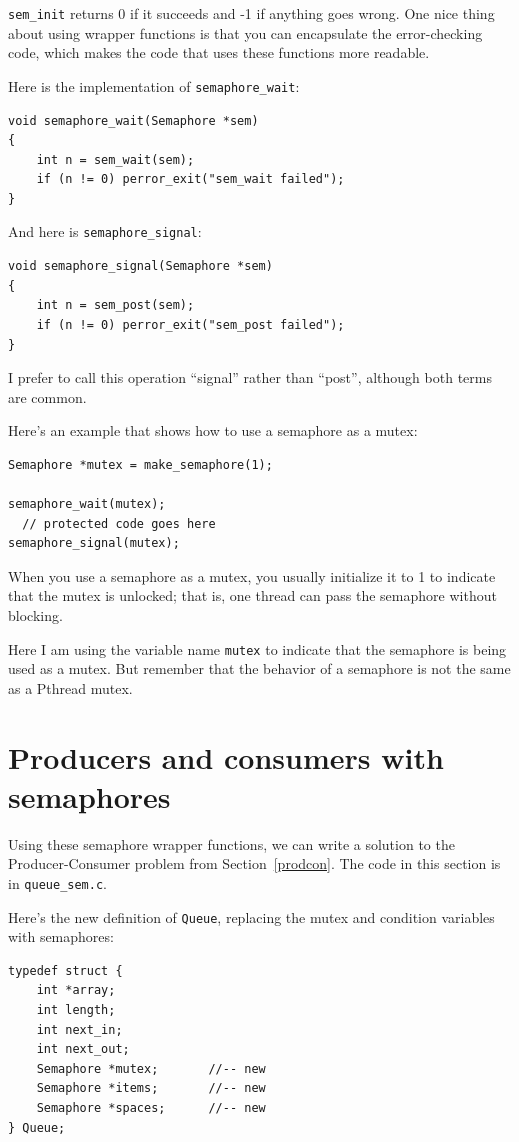 \documentclass[12pt]{book}
\begin{document}
{{\tt sem\_init} returns 0 if it succeeds and -1 if anything goes
wrong.  One nice thing about using wrapper functions is that you can
encapsulate the error-checking code, which makes the code that uses
these functions more readable.

Here is the implementation of \verb"semaphore_wait":

\begin{verbatim}
void semaphore_wait(Semaphore *sem)
{
    int n = sem_wait(sem);
    if (n != 0) perror_exit("sem_wait failed");
}
\end{verbatim}

And here is \verb"semaphore_signal":

\begin{verbatim}
void semaphore_signal(Semaphore *sem)
{
    int n = sem_post(sem);
    if (n != 0) perror_exit("sem_post failed");
}
\end{verbatim}

I prefer to call this operation ``signal'' rather than ``post'',
although both terms are common.

Here's an example that shows how to use a semaphore as a mutex:

\begin{verbatim}
Semaphore *mutex = make_semaphore(1);

semaphore_wait(mutex);
  // protected code goes here
semaphore_signal(mutex);
\end{verbatim}

When you use a semaphore as a mutex, you usually
initialize it to 1 to indicate
that the mutex is unlocked; that is, one thread can
pass the semaphore without blocking.

Here I am using the variable name {\tt mutex} to indicate that
the semaphore is being used as a mutex.  But remember that the behavior
of a semaphore is not the same as a Pthread mutex.


\section{Producers and consumers with semaphores}

Using these semaphore wrapper functions, we can
write a solution to the Producer-Consumer problem from
Section~\ref{prodcon}.
The code in this section is in \verb"queue_sem.c".

Here's the new definition of {\tt Queue}, replacing the mutex
and condition variables with semaphores:

\begin{verbatim}
typedef struct {
    int *array;
    int length;
    int next_in;
    int next_out;
    Semaphore *mutex;       //-- new
    Semaphore *items;       //-- new
    Semaphore *spaces;      //-- new
} Queue;
\end{verbatim}

}
\end{document}
